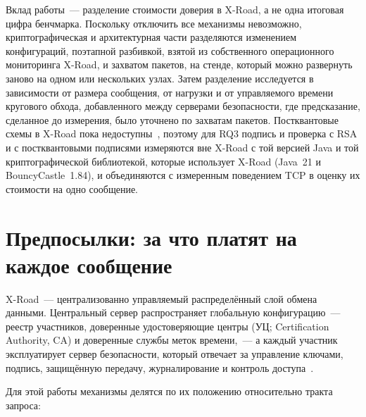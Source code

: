 \documentclass[conference,a4paper]{IEEEtran}
\newcommand{\newtext}[1]{{\color{blue}#1}}
\begin{document}
{Вклад работы~--- разделение стоимости доверия в X-Road, а не одна итоговая цифра бенчмарка.
Поскольку отключить все механизмы невозможно, криптографическая и архитектурная части
разделяются изменением конфигураций, поэтапной разбивкой, взятой из собственного операционного
мониторинга X-Road, и захватом пакетов, на стенде, который можно развернуть заново на одном или
нескольких узлах. Затем разделение исследуется в зависимости от размера сообщения, от нагрузки и от
управляемого времени кругового обхода, добавленного между серверами безопасности, где предсказание,
сделанное до измерения, было уточнено по захватам пакетов. Постквантовые схемы в X-Road пока
недоступны~\cite{bakhtina2026pqc,snetkov2023}, поэтому для RQ3 подпись и проверка с RSA и с
постквантовыми подписями измеряются вне X-Road \newtext{с той версией Java и той криптографической
библиотекой, которые использует X-Road (Java~21 и BouncyCastle~1.84),} и объединяются с измеренным
поведением TCP в оценку их стоимости на одно сообщение.\par}

\section{Предпосылки: за что платят на каждое сообщение}\label{sec:bg}

X-Road~--- централизованно управляемый распределённый слой обмена данными. Центральный сервер
распространяет глобальную конфигурацию~--- реестр участников, доверенные удостоверяющие центры (УЦ;
Certification Authority, CA) и доверенные службы меток времени,~--- а каждый участник эксплуатирует
сервер безопасности, который отвечает за управление ключами, подпись, защищённую передачу,
журналирование и контроль доступа~\cite{bakhtina2023ares,
xroadarcss}.

Для этой работы механизмы делятся по их положению относительно тракта запроса:
\end{document}
